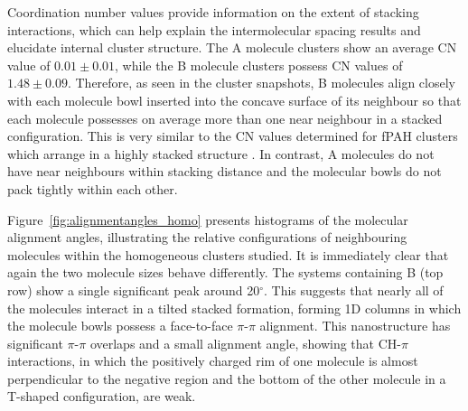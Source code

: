 Coordination number values provide information on the extent of stacking interactions, which can help explain the intermolecular spacing results and elucidate internal cluster structure. The A molecule clusters show an average CN value of $0.01 \pm 0.01$, while the B molecule clusters possess CN values of $1.48 \pm 0.09$. Therefore, as seen in the cluster snapshots, B molecules align closely with each molecule bowl inserted into the concave surface of its neighbour so that each molecule possesses on average more than one near neighbour in a stacked configuration. This is very similar to the CN values determined for fPAH clusters which arrange in a highly stacked structure \cite{bowal2018partitioning}. In contrast, A molecules do not have near neighbours within stacking distance and the molecular bowls do not pack tightly within each other. 
%

Figure~\ref{fig:alignmentangles_homo} presents histograms of the molecular alignment angles, illustrating the relative configurations of neighbouring molecules within the homogeneous clusters studied. It is immediately clear that again the two molecule sizes behave differently. The systems containing B (top row) show a single significant peak around 20$^{\circ}$.  This suggests that nearly all of the molecules interact in a tilted stacked formation, forming 1D columns in which the molecule bowls possess a face-to-face $\pi$-$\pi$ alignment. This nanostructure has significant $\pi$-$\pi$ overlaps and a small alignment angle, showing that CH-$\pi$ interactions, in which the positively charged rim of one molecule is almost perpendicular to the negative region and the bottom of the other molecule in a T-shaped configuration, are weak.  

